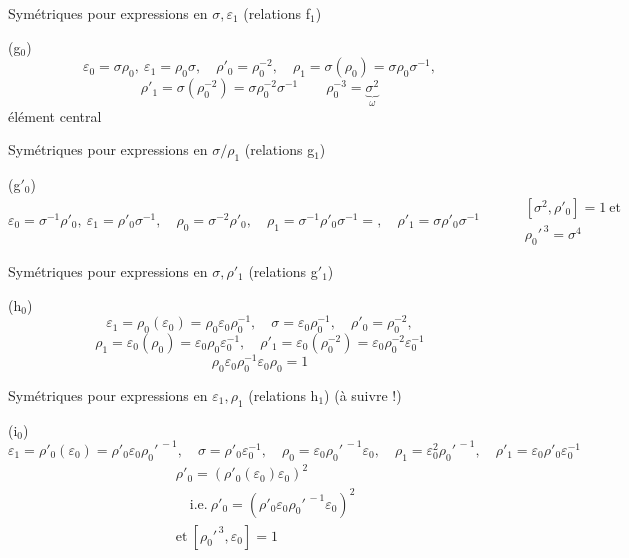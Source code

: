 \documentclass[11pt,a4paper]{article}
\begin{document}
Symétriques pour expressions en $\sigma, \varepsilon_1$ (relations f$_1$)

(g$_0$) 
\[
\varepsilon_0 = \sigma\rho_0, \ \varepsilon_1 = \rho_0\sigma, \quad
\rho'_0 = \rho_0^{-2}, \quad
\rho_1 = \sigma(\rho_0) = \sigma\rho_0\sigma^{-1},
\]
\[
\rho'_1 = \sigma(\rho_0^{-2}) = \sigma\rho_0^{-2}\sigma^{-1}
\qquad
\boxed{\rho_0^{-3} = \underbrace{\sigma^{2}}_{\omega}}
\]
\struck{\ill{}} élément \struck{\ill{}}  central

Symétriques pour expressions en $\sigma/\rho_1$ (relations g$_1$)

(g$'_0$) 
\[
\varepsilon_0 = \sigma^{-1}\rho'_0, \ \varepsilon_1 = \rho'_0\sigma^{-1}, \quad
\rho_0 = \sigma^{-2}\rho'_0, \quad
\rho_1 = \sigma^{-1}\rho'_0\sigma^{-1} =, \quad
\rho'_1 = \sigma\rho'_0\sigma^{-1}
\qquad
\boxed{\begin{aligned} &[\sigma^2, \rho'_0] = 1 \ \text{et} \\ &\rho_0'^{\,3} = \sigma^4 \end{aligned}}
\]

Symétriques pour expressions en $\sigma, \rho'_1$ (relations g$'_1$)

(h$_0$) 
\[
\varepsilon_1 = \rho_0(\varepsilon_0) = \rho_0\varepsilon_0\rho_0^{-1}, \quad
\sigma = \varepsilon_0\rho_0^{-1}, \quad
\rho'_0 = \rho_0^{-2},
\]
\[
\rho_1 = \varepsilon_0(\rho_0) = \varepsilon_0\rho_0\varepsilon_0^{-1}, \quad
\rho'_1 = \varepsilon_0(\rho_0^{-2}) = \varepsilon_0\rho_0^{-2}\varepsilon_0^{-1}
\]
\[
\boxed{\rho_0\varepsilon_0\rho_0^{-1}\varepsilon_0\rho_0 = 1}
\]

Symétriques pour expressions en $\varepsilon_1, \rho_1$ (relations h$_1$) \quad (à suivre !)


(i$_0$) 
\[
\varepsilon_1 = \rho'_0(\varepsilon_0) = \rho'_0\varepsilon_0\rho_0'^{\,-1}, \quad
\sigma = \rho'_0\varepsilon_0^{-1}, \quad
\rho_0 = \varepsilon_0\rho_0'^{\,-1}\varepsilon_0, \quad
\rho_1 = \varepsilon_0^2\rho_0'^{\,-1}, \quad
\rho'_1 = \varepsilon_0\rho'_0\varepsilon_0^{-1}
\]
\[
\boxed{\begin{aligned}
&\rho'_0 = (\rho'_0(\varepsilon_0)\varepsilon_0)^2 \\
&\quad \text{i.e.} \ \rho'_0 = (\rho'_0\varepsilon_0\rho_0'^{\,-1}\varepsilon_0)^2 \\
&\text{et} \ [\rho_0'^{\,3}, \varepsilon_0] = 1
\end{aligned}}
\]
\end{document}
